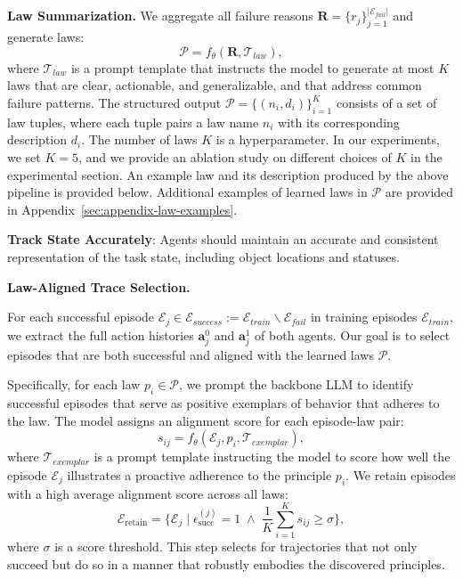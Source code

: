 \documentclass{article}
\theoremstyle{plain}
\theoremstyle{definition}
\theoremstyle{remark}
\begin{document}
\textbf{Law Summarization.} We aggregate all failure reasons $\mathbf{R} = \{r_j\}_{j=1}^{|\mathcal{E}_{fail}|}$ and generate laws:
\begin{equation}
\mathcal{P} = f_\theta(\mathbf{R}, \mathcal{T}_{law}),
\end{equation}
where $\mathcal{T}_{law}$ is a prompt template that instructs the model to generate at most $K$ laws that are clear, actionable, and generalizable, and that address common failure patterns. The structured output $\mathcal{P} = \{(n_i, d_i)\}_{i=1}^K$ consists of a set of law tuples, where each tuple pairs a law name $n_i$ with its corresponding description $d_i$. 
The number of laws $K$ is a hyperparameter. In our experiments, we set $K = 5$, and we provide an ablation study on different choices of $K$ in the experimental section. An example law and its description produced by the above pipeline is provided below. Additional examples of learned laws in $\mathcal{P}$ are provided in Appendix~\ref{sec:appendix-law-examples}.
\begin{mdframed}[linewidth=0.8pt, roundcorner=4pt, innerleftmargin=6pt, innerrightmargin=6pt, innertopmargin=6pt, innerbottommargin=6pt]
\textbf{Track State Accurately}: Agents should maintain an accurate and consistent representation of the task state, including object locations and statuses.
\end{mdframed}


\textbf{Law-Aligned Trace Selection.} 

For each successful episode $\mathcal{E}_j \in \mathcal{E}_{success}:=\mathcal{E}_{train}\backslash\mathcal{E}_{fail}$ in training episodes $\mathcal{E}_{train}$, we extract the full action histories $\mathbf{a}_j^0$ and $\mathbf{a}_j^1$ of both agents. Our goal is to select episodes that are both successful and aligned with the learned laws $\mathcal{P}$.

Specifically, for each law $p_i \in \mathcal{P}$, we prompt the backbone LLM to identify successful episodes that serve as positive exemplars of behavior that adheres to the law. The model assigns an alignment score for each episode-law pair:
\begin{equation}
s_{ij} = f_\theta(\mathcal{E}_j, p_i, \mathcal{T}_{exemplar}),
\end{equation}
where $\mathcal{T}_{exemplar}$ is a prompt template instructing the model to score how well the episode $\mathcal{E}_j$ illustrates a proactive adherence to the principle $p_i$. We retain episodes with a high average alignment score across all laws:
\begin{equation}
\mathcal{E}_{\text{retain}} 
= \{ \mathcal{E}_j \mid \epsilon_{\text{succ}}^{(j)} = 1 \;\wedge\; \frac{1}{K}\sum_{i=1}^K s_{ij} \geq \sigma \},
\end{equation}
where $\sigma$ is a score threshold. This step selects for trajectories that not only succeed but do so in a manner that robustly embodies the discovered principles.
\end{document}
